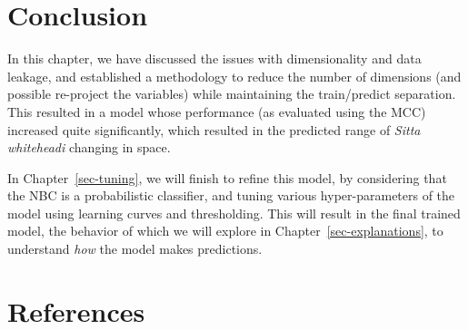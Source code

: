\documentclass[
  letterpaper,
]{scrbook}
\begin{document}
\section{Conclusion}\label{conclusion-4}

In this chapter, we have discussed the issues with dimensionality and
data leakage, and established a methodology to reduce the number of
dimensions (and possible re-project the variables) while maintaining the
train/predict separation. This resulted in a model whose performance (as
evaluated using the MCC) increased quite significantly, which resulted
in the predicted range of \emph{Sitta whiteheadi} changing in space.

In Chapter~\ref{sec-tuning}, we will finish to refine this model, by
considering that the NBC is a probabilistic classifier, and tuning
various hyper-parameters of the model using learning curves and
thresholding. This will result in the final trained model, the behavior
of which we will explore in Chapter~\ref{sec-explanations}, to
understand \emph{how} the model makes predictions.

\section*{References}\label{bibliography-6}

\end{document}
